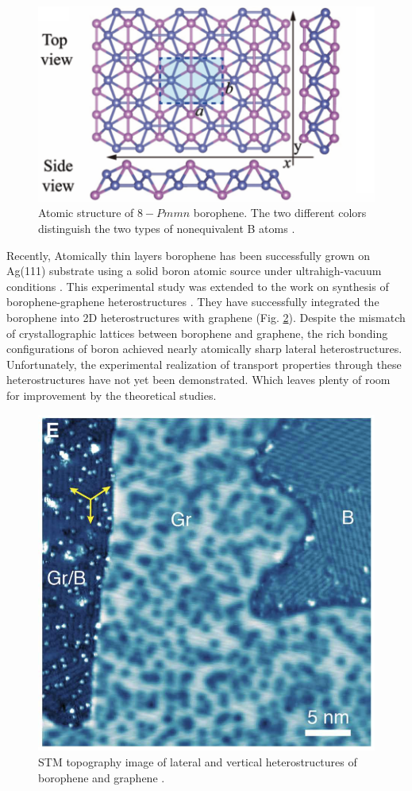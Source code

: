    \begin{figure}[H]
        \centering
        \includegraphics[width = 0.6\linewidth]{fig/Chap 2/borophene atomic structure.png}
        \caption{Atomic structure of $8-Pmmn$ borophene. The two different colors distinguish the two types of nonequivalent B atoms \cite{Cheng2017a}.}
        \label{2fig:borophene atomic structure}
    \end{figure}
    
    Recently, Atomically thin layers borophene has been successfully grown on Ag(111) substrate using a solid boron atomic source under ultrahigh-vacuum conditions \cite{Mannix2015a}.
    This experimental study was extended to the work on synthesis of borophene-graphene heterostructures \cite{Liu2019}.
    They have successfully integrated the borophene into 2D heterostructures with graphene (Fig. \ref{2fig:borophene graphene hetero}).
    Despite the mismatch of crystallographic lattices between borophene and graphene, the rich bonding configurations of boron achieved nearly atomically sharp lateral heterostructures.
    Unfortunately, the experimental realization of transport properties through these heterostructures have not yet been demonstrated.
    Which leaves plenty of room for improvement by the theoretical studies.
    
    \begin{figure}[H]
        \centering
        \includegraphics[width = 0.4\linewidth]{fig/Chap 2/borophene graphene.png}
        \caption{STM topography image of lateral and vertical heterostructures of borophene and graphene \cite{Liu2019}.}
        \label{2fig:borophene graphene hetero}
    \end{figure}
    


